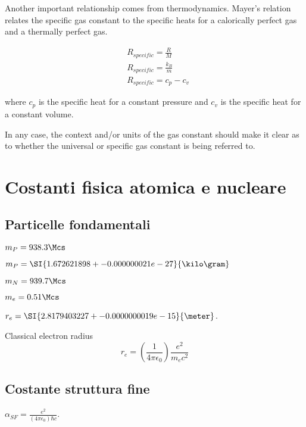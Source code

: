 \documentclass[oneside,12pt,fleqn]{memoir}
\begin{document}
Another important relationship comes from thermodynamics. Mayer's relation relates the specific gas constant to the specific heats for a calorically perfect gas and a thermally perfect gas.

\begin{align*}
&R_{specific} = \frac{R}{M}\\
&R_{specific} = \frac{{k_{B}}}{m}\\
&R_{specific} = c_p - c_v
\end{align*}

where $c_p$ is the specific heat for a constant pressure and $c_v$ is the specific heat for a constant volume.

In any case, the context and/or units of the gas constant should make it clear as to whether the universal or specific gas constant is being referred to.
 
\chapter{Costanti fisica atomica e nucleare}
\PartialToc

\section{Particelle fondamentali}

\begin{itemize*}
\item $m_P=938.3\Mcs$
\item $m_P=\SI{1.672 621 898+-0.000 000 021e-27}{\kilo\gram}$
\item $m_N=939.7\Mcs$
\item $m_e=0.51\Mcs$
\item $r_e=\SI{2.817 940 3227+-0.000 000 0019e-15}{\meter}$.

\begin{definition}{Classical electron radius}
\begin{equation*}
r_e=(\frac{1}{4\pi\epsilon_0})\frac{e^2}{m_ec^2}
\end{equation*}
\end{definition}
\end{itemize*}



\section{Costante struttura fine}
 
 $\alpha_{SF}=\frac{e^2}{(4\pi\epsilon_0)\hbar c}$.
\end{document}
